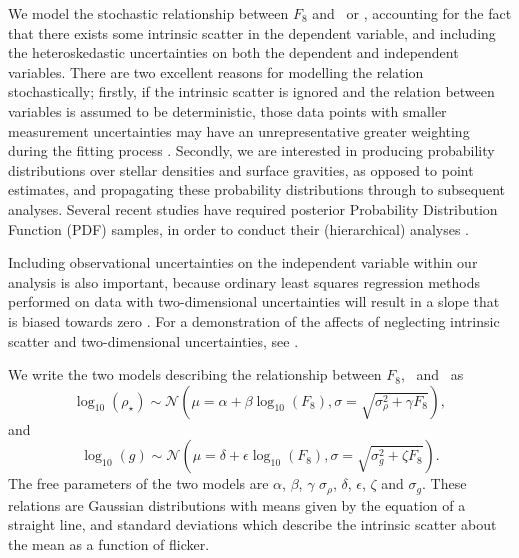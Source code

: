 We model the stochastic relationship between $F_8$ and \logg\ or \rhostar,
accounting for the fact that there exists some intrinsic scatter in
the dependent variable, and including the heteroskedastic uncertainties on both
the dependent and independent variables.
There are two excellent reasons for modelling the relation stochastically;
firstly, if the intrinsic scatter is ignored and the relation between
variables is assumed to be deterministic, those data points with smaller
measurement uncertainties may have an unrepresentative greater weighting
during the fitting process \citep{hogg:2010b}.
Secondly, we are interested in producing probability distributions over stellar
densities and surface gravities, as opposed to point estimates, and propagating
these probability distributions through to subsequent analyses.
Several recent studies have required posterior Probability Distribution
Function (PDF) samples, in order to conduct their (hierarchical)
analyses \citep[e.g.][]{foreman-mackey:2014, rogers:2015, angus:2015}.

Including observational uncertainties on the independent variable within our
analysis is also important, because ordinary least squares regression methods
performed on data with two-dimensional uncertainties will result in a slope
that is biased towards zero
\citep[e.g.][]{fuller:1987, fox:1997}.
For a demonstration of the affects of neglecting intrinsic scatter and
two-dimensional uncertainties, see \citet{kelly:2007}.

We write the two models describing the relationship between $F_8$, \logg\ and
\rhostar\ as
\begin{equation}
	\log_{10}(\rho_\star) \sim \mathcal{N} \left(\mu = \alpha + \beta
	\log_{10}(F_8), \sigma = \sqrt{\sigma_{\rho}^2 + \gamma F_8}\right),
\end{equation}
\label{eq:rho}
and
\begin{equation}
	\log_{10}(g) \sim \mathcal{N}\left(\mu = \delta + \epsilon \log_{10}(F_8),
	\sigma = \sqrt{\sigma_g^2 + \zeta F_8}\right).
\end{equation}
\label{eq:logg}
The free parameters of the two models are $\alpha$, $\beta$, $\gamma$
$\sigma_{\rho}$, $\delta$, $\epsilon$, $\zeta$ and $\sigma_g$.
These relations are Gaussian distributions with means
given by the equation of a straight line, and standard deviations which
describe the intrinsic scatter about the mean as a function of flicker.


